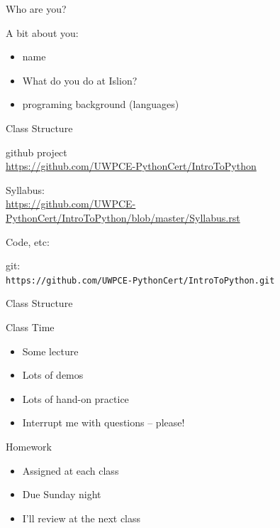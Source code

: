 \documentclass{beamer}
\begin{document}
\begin{frame}{Who are you?}

{\Large A bit about you:}
\begin{itemize}
  \item name
  \item What do you do at Islion?
  \item programing background (languages)
\end{itemize}

\end{frame}


\begin{frame}[fragile]{Class Structure}

{\LARGE github project} \\
\url{https://github.com/UWPCE-PythonCert/IntroToPython}

\vspace{0.2in}
{\large Syllabus:} \\
\url{https://github.com/UWPCE-PythonCert/IntroToPython/blob/master/Syllabus.rst} 

\vspace{0.2in}
{\large Code, etc:}

git: \\
\verb|https://github.com/UWPCE-PythonCert/IntroToPython.git|

\end{frame}

\begin{frame}{Class Structure}

{\Large Class Time}
  \begin{itemize}
     \item Some lecture
     \item Lots of demos
     \item Lots of hand-on practice
     \item Interrupt me with questions -- please!
  \end{itemize}

\vspace{0.25in}
{\Large Homework}
  \begin{itemize}
     \item Assigned at each class
     \item Due Sunday night
     \item I'll review at the next class
  \end{itemize}


\end{frame}
\end{document}
